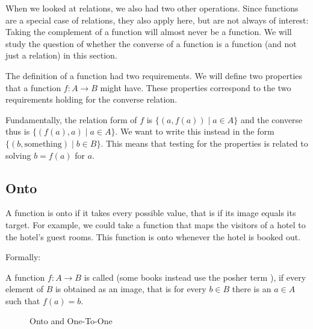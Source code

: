 When we looked at relations, we also had two other operations. Since functions are a
special case of relations, they also apply here, but are not always of interest:
Taking the complement of a function will almost never be a function. We will study the
question of whether the converse of a function is a function (and not just a relation)
in this section.
\medskip

The definition of a function had two requirements. We will define two properties that a
function $f\colon A\to B$ might have. These properties correspond to the two requirements holding for the converse relation.

Fundamentally, the relation form of $f$ is $\{(a,f(a))\mid a\in A\}$ and the converse
thus is $\{(f(a),a)\mid a\in A\}$. We want to write this instead in
the form $\{(b,\mbox{something})\mid b\in B\}$. This means that testing for the properties
is related to solving $b=f(a)$ for $a$.

\subsection{Onto}

A function is onto if it takes every possible value, that is if its image
equals its target.
For example, we could take a function that maps the visitors of a hotel to
the hotel's guest rooms. This function is onto whenever the hotel is booked
out.

Formally:
\begin{defn}
A function $f\colon A\to B$ is called  (some books instead use the posher
term ), if every element of $B$ is obtained as an image, that is for every $b\in B$ there is an $a\in A$ such that $f(a)=b$.
\end{defn}

\begin{figure}[t]
\begin{center}
\caption{Onto and One-To-One}
\label{figoneonto}
\end{center}
\end{figure}

